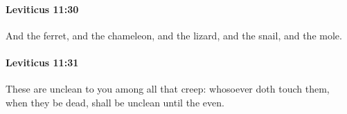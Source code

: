 		\paragraph{Leviticus 11:30} %
			\label{LEVITICUS-11-30}

			And the ferret, and the chameleon, and the lizard, and the snail, and the mole.


		\paragraph{Leviticus 11:31} %
			\label{LEVITICUS-11-31}

			These are unclean to you among all that creep: whosoever doth touch them, when they be dead, shall be unclean until the even.


